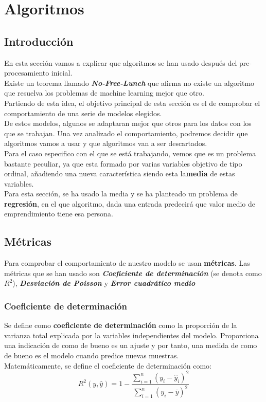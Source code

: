 \section{Algoritmos}
\label{sec:algoritmos}
\subsection{Introducción}
En esta sección vamos a explicar que algoritmos se han usado después del pre-procesamiento inicial.\\
Existe un teorema llamado\textbf{ \textit{No-Free-Lunch}} que afirma no existe un algoritmo que resuelva los problemas de machine learning mejor que otro.\\
Partiendo de esta idea, el objetivo principal de esta sección es el de comprobar el comportamiento de una serie de modelos elegidos. \\
De estos modelos, algunos se adaptaran mejor que otros para los datos con los que se trabajan. Una vez analizado el comportamiento, podremos decidir que algoritmos vamos a usar y que algoritmos van a ser descartados. \\
\linebreak
Para el caso especifico con el que se está trabajando, vemos que es un problema bastante peculiar, ya que esta formado por varias variables objetivo de tipo ordinal, añadiendo una nueva característica siendo esta la\textbf{media} de estas variables.\\
Para esta sección, se ha usado la media y se ha planteado un problema de \textbf{regresión}, en el que algoritmo, dada una entrada predecirá que valor medio de emprendimiento tiene esa persona.

\subsection{Métricas}
Para comprobar el comportamiento de nuestro modelo se usan \textbf{métricas}.  Las métricas que se han usado son \textit{\textbf{Coeficiente de determinación}} (se denota como $R^2$), \textit{\textbf{Desviación de Poisson}} y \textit{\textbf{Error cuadrático medio}}
\subsubsection{Coeficiente de determinación}
Se define como \textbf{coeficiente de determinación} como la proporción de la varianza total explicada por la variables independientes del modelo. Proporciona una indicación de como de bueno es un ajuste y por tanto, una medida de como de bueno es el modelo cuando predice nuevas muestras.\\
\linebreak
Matemáticamente, se define el coeficiente de determinación como:
\[
	R^2 (y, \hat{y}) = 1 - \frac{\sum_{i=1}^{n}(y_i - \hat{y}_i)^2}    {\sum_{i=1}^{n} (y_i - \overline{y})^2}
\]

